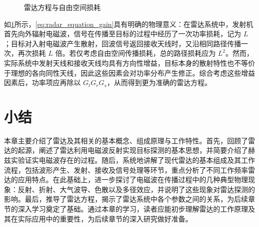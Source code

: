 \begin{figure}[htb!]
    \centering
    \caption{雷达方程与自由空间损耗}
    \label{fig_chp1_radar_equation_gain}
\end{figure}

如\cref{fig_chp1_radar_equation_gain}所示，\cref{eq:radar_equation_gain}具有明确的物理意义：在雷达系统中，发射机首先向外辐射电磁波，信号在传播至目标的过程中经历了一次功率损耗，记为 $L$；目标对入射电磁波产生散射，回波信号返回接收天线时，又沿相同路径传播一次，再次损耗 $L$ 倍。若仅考虑自由空间传播损耗，总的路径损耗应为 $L^2$。然而，实际系统中发射天线和接收天线均具有方向性增益，目标本身的散射特性也不等价于理想的各向同性天线，因此这些因素会对功率分布产生修正。综合考虑这些增益因素后，功率项应再除以 $G_t G_r G_s$，从而得到更为准确的雷达方程。

\section{小结}

本章主要介绍了雷达及其相关的基本概念、组成原理与工作特性。首先，回顾了雷达的起源，阐述了雷达利用电磁波反射实现目标探测的基本思想，并简要介绍了赫兹实验证实电磁波存在的过程。随后，系统地讲解了现代雷达的基本组成及其工作流程，包括波形产生、发射、接收及信号处理等环节，重点分析了不同工作频率雷达的应用特点。在此基础上，进一步探讨了电磁波在传播过程中的几种典型物理现象：反射、折射、大气波导、色散以及多径效应，并说明了这些现象对雷达探测的影响。最后，推导了雷达方程，揭示了雷达系统中各个参数之间的关系，为后续章节的深入学习奠定了基础。通过本章的学习，读者应能初步理解雷达的工作原理及其在实际应用中的重要性，为后续章节的深入研究做好准备。
